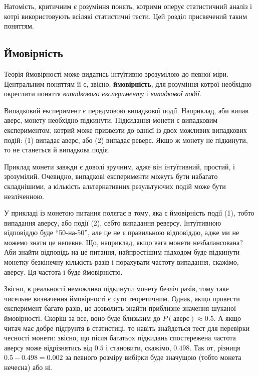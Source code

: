 \documentclass[
  11pt,
]{book}
\begin{document}
Натомість, критичним є розуміння понять, котрими оперує статистичний аналіз і котрі використовують всілякі статистичні тести. Цей розділ присвячений таким поняттям.

\subsection{Ймовірність}\label{ux439ux43cux43eux432ux456ux440ux43dux456ux441ux442ux44c}

Теорія ймовірності може видатись інтуїтивно зрозумілою до певної міри. Центральним поняттям її є, звісно, \textbf{ймовірність}, для розуміння котрої необхідно окреслити поняття \emph{випадкового експерименту} і \emph{випадкової події}.

Випадковий експеримент є передмовою випадкової події. Наприклад, аби випав аверс, монету необхідно підкинути. Підкидання монети є випадковим експериментом, котрий може призвезти до однієї із двох можливих випадкових подій: (1) випадає аверс, або (2) випадає реверс. Якщо ж монету не підкинути, то не станеться й випадкова подія.

Приклад монети завжди є доволі зручним, адже він інтуїтивний, простий, і зрозумілий. Очевидно, випадкові експерименти можуть бути набагато складнішими, а кількість альтернативних результуючих подій може бути незліченною.

У прикладі із монетою питання полягає в тому, яка є ймовірність події (1), тобто випадання аверсу, або події (2), себто випадання реверсу. Інтуїтивною відповіддю буде ``50-на-50'', але це не є правильною відповіддю, адже ми не можемо знати це непевне. Що, наприклад, якщо вага монети незбалансована? Аби знайти відповідь на це питання, найпростішим підходом буде підкинути монетку безкінечну кількість разів і порахувати частоту випадання, скажімо, аверсу. Ця частота і буде ймовірністю.

Звісно, в реальності неможливо підкинути монету безліч разів, тому таке чисельне визначення ймовірності є суто теоретичним. Однак, якщо провести експеримент багато разів, це дозволить знайти приблизне значення шуканої ймовірності. Скоріш за все, воно буде близьким до \(P(аверс) \approx 0.5\). А якщо читач має добре підґрунтя в статистиці, то навіть знайдеться тест для перевірки чесності монети: звісно, що після багатьох підкидань спостережена частота аверсу може відрізнятись від \(0.5\) і становити, скажімо, \(0.498\). Так от, різниця \(0.5 - 0.498 = 0.002\) за певного розміру вибірки буде значущою (тобто монета нечесна) або ні.
\end{document}
